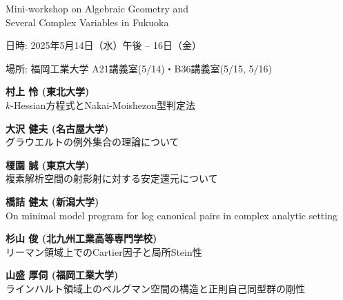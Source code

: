 \documentclass[dvipdfmx,a4paper,12pt]{article}
\theoremstyle{plain} %
\theoremstyle{definition} %
\begin{document}
\begin{center}
  {\LARGE Mini-workshop on Algebraic Geometry and  \\ Several Complex Variables in Fukuoka}
 
  \end{center}
  
\vskip5mm
\begin{flushleft}
{\large 日時: 2025年5月14日（水）午後 -- 16日（金）}


{\large 場所: 福岡工業大学 A21講義室(5/14)・B36講義室(5/15, 5/16)
}

\end{flushleft}




\vskip5mm
\vskip3mm

\vskip1mm
{\bf 村上 怜 (東北大学)}\\
$k$-Hessian方程式とNakai-Moishezon型判定法
\vskip3mm

{\bf 大沢 健夫 (名古屋大学)}\\
グラウエルトの例外集合の理論について 
\vskip3mm

{\bf 榎園 誠 (東京大学)}\\
複素解析空間の射影射に対する安定還元について

\vskip5mm


\vskip1mm
{\bf 橋詰 健太 (新潟大学)}\\
On minimal model program for log canonical pairs in complex analytic setting 
\vskip3mm

{\bf  杉山 俊 (北九州工業高等専門学校)}\\
リーマン領域上でのCartier因子と局所Stein性
\vskip3mm

{\bf 山盛 厚伺 (福岡工業大学) }\\
ラインハルト領域上のベルグマン空間の構造と正則自己同型群の剛性
\vskip3mm
\end{document}

